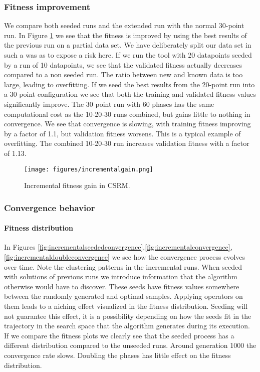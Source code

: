 \subsubsection{Fitness improvement}
We compare both seeded runs and the extended run with the normal 30-point run. In Figure \ref{fig:incrementalgain} we see that the fitness is improved by using the best results of the previous run on a partial data set. We have deliberately split our data set in such a was as to expose a risk here. If we run the tool with 20 datapoints seeded by a run of 10 datapoints, we see that the validated fitness actually decreases compared to a non seeded run. The ratio between new and known data is too large, leading to overfitting. If we seed the best results from the 20-point run into a 30 point configuration we see that both the training and validated fitness values significantly improve. 
The 30 point run with 60 phases has the same computational cost as the 10-20-30 runs combined, but gains little to nothing in convergence. We see that convergence is slowing, with training fitness improving by a factor of 1.1, but validation fitness worsens. This is a typical example of overfitting. The combined 10-20-30 run increases validation fitness with a factor of 1.13.
\begin{figure}
    \centering
    \texttt{[image: figures/incrementalgain.png]}
    \caption{Incremental fitness gain in CSRM.}
    \label{fig:incrementalgain}
\end{figure}
\subsubsection{Convergence behavior}
\paragraph{Fitness distribution}
In Figures \ref{fig:incrementalseededconvergence},\ref{fig:incrementalconvergence},\ref{fig:incrementaldoubleconvergence} we see how the convergence process evolves over time. 
Note the clustering patterns in the incremental runs. When seeded with solutions of previous runs we introduce information that the algorithm otherwise would have to discover. These seeds have fitness values somewhere between the randomly generated and optimal samples. Applying operators on them leads to a niching effect visualized in the fitness distribution. Seeding will not guarantee this effect, it is a possibility depending on how the seeds fit in the trajectory in the search space that the algorithm generates during its execution.
If we compare the fitness plots we clearly see that the seeded process has a different distribution compared to the unseeded runs. Around generation 1000 the convergence rate slows. Doubling the phases has little effect on the fitness distribution. 
